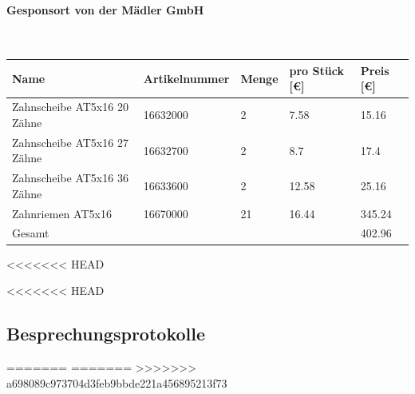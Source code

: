 \paragraph{Gesponsort von der Mädler GmbH}\mbox{}\\
\begin{table}[H]
    \begin{tabular}{lllll}
    Name                           & Artikelnummer & Menge & pro Stück {[}€{]} & Preis {[}€{]}  \\ \hline
    Zahnscheibe AT5x16 20 Zähne    & 16632000      & 2     & 7.58            & 15.16  \\
    Zahnscheibe AT5x16 27 Zähne & 16632700      & 2     & 8.7             & 17.4   \\
    Zahnscheibe AT5x16 36 Zähne   & 16633600      & 2     & 12.58           & 25.16  \\
    Zahnriemen AT5x16              & 16670000      & 21    & 16.44           & 345.24 \\ \hline
    Gesamt                         &               &       &                 & 402.96
    \end{tabular}
\end{table}
\newpage
<<<<<<< HEAD

<<<<<<< HEAD
\subsection{Besprechungsprotokolle}

=======
=======
>>>>>>> a698089c973704d3feb9bbde221a456895213f73
